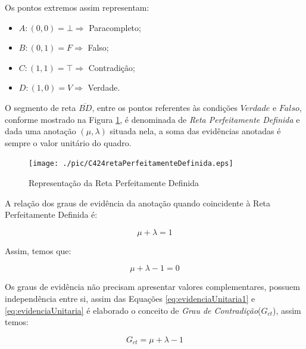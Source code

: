 Os pontos extremos assim representam:

\begin{itemize}
\item $A: (0,0) = \bot \Rightarrow $ Paracompleto;
\item $B: (0,1) = F \Rightarrow $ Falso;
\item $C: (1,1) = \top \Rightarrow $ Contradição;
\item $D: (1,0) = V \Rightarrow $ Verdade.
\end{itemize}

O segmento de reta $\overline{BD}$, entre os pontos referentes às condições $Verdade$ e $Falso$, conforme mostrado na Figura \ref{fig:retaPerfeitamenteDefinida}, é denominada de \emph{Reta Perfeitamente Definida} e dada uma anotação $(\mu, \lambda )$ situada nela, a soma das evidências anotadas é sempre o valor unitário do quadro. 

\begin{figure}[!htb]
\center\texttt{[image: ./pic/C424retaPerfeitamenteDefinida.eps]}
\caption{Representação da Reta Perfeitamente Definida}
\label{fig:retaPerfeitamenteDefinida}
\end{figure}

A relação dos graus de evidência da anotação quando coincidente à Reta Perfeitamente Definida é: 

\begin{center}
\begin{equation}
\mu + \lambda = 1
\label{eq:evidenciaUnitaria1}
\end{equation}
\end{center}

Assim, temos que:

\begin{center}
\begin{equation}
\mu + \lambda - 1 = 0
\label{eq:evidenciaUnitaria}
\end{equation}
\end{center}


Os graus de evidência não precisam apresentar valores complementares, possuem independência entre si, assim das Equações  
\ref{eq:evidenciaUnitaria1} e 
\ref{eq:evidenciaUnitaria} 
é elaborado o conceito de 
\emph{Grau de Contradição}($G_{ct}$), 
assim temos: 

\begin{center}
\begin{equation}
G _{ct} = \mu + \lambda - 1
\label{eq:grauIncerteza}
\end{equation}
\end{center}

